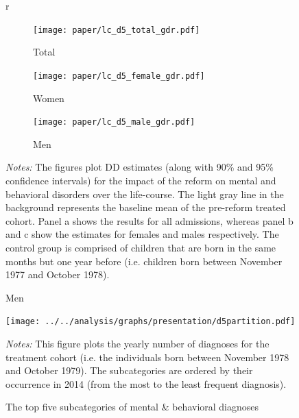 \documentclass[11pt, a4paper]{article} %
\begin{document}
\begin{landscape}
	\vspace*{\fill}
	\begin{figure}[H]\centering
		\caption{Life-course approach for mental and behavioral disorders}\label{fig: lc_d5_gdr_DD}r	\begin{subfigure}[h]{0.31\linewidth}\centering\caption{Total}
			\texttt{[image: paper/lc\_d5\_total\_gdr.pdf]}
		\end{subfigure}
		\begin{subfigure}[h]{0.31\linewidth}\centering\caption{Women}
			\texttt{[image: paper/lc\_d5\_female\_gdr.pdf]}
		\end{subfigure}
		\quad
		\begin{subfigure}[h]{0.31\linewidth}\centering\caption{Men}
			\texttt{[image: paper/lc\_d5\_male\_gdr.pdf]}
		\end{subfigure}
		\scriptsize
		\begin{minipage}{\linewidth}
			\emph{Notes:} The figures plot DD estimates (along with 90\% and 95\% confidence intervals) for the impact of the reform on mental and behavioral disorders over the life-course. The light gray line in the background represents the baseline mean of the pre-reform treated cohort. Panel a shows the results for all admissions, whereas panel b and c show the estimates for females and males respectively. The control group is comprised of children	that are born in the same months but one year before (i.e. children born between November 1977 and October 1978).
		\end{minipage}
	\end{figure}
	\vspace*{\fill}\clearpage
\end{landscape}

\vspace*{\fill}
\begin{figure}[H]\centering
	\caption{The top five subcategories of mental \& behavioral diagnoses}\label{fig: d5partition}
	\texttt{[image: ../../analysis/graphs/presentation/d5partition.pdf]}
	\scriptsize
	\begin{minipage}{0.9\linewidth}
	\emph{Notes:} This figure plots the yearly number of diagnoses for the treatment cohort (i.e. the individuals born between November 1978 and October 1979). The subcategories are ordered by their occurrence in 2014 (from the most to the least frequent diagnosis).
	\end{minipage}
\end{figure}
\vspace*{\fill}\clearpage
\newpage
\end{document}
